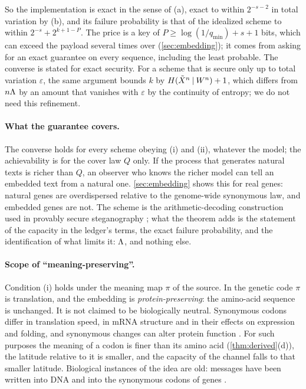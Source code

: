 So the implementation is exact in the sense of (a), exact to within $2^{-s-2}$ in total variation by (b), and its failure probability is that of the idealized scheme to within $2^{-s}+2^{k+1-P}$. The price is a key of $P\ge\log(1/q_{\min})+s+1$ bits, which can exceed the payload several times over (\cref{sec:embedding}); it comes from asking for an exact guarantee on every sequence, including the least probable. The converse is stated for exact security. For a scheme that is secure only up to total variation $\varepsilon$, the same argument bounds $k$ by $H(\tilde X^n\mathbin{\vert} W^n)+1$, which differs from $n\Lambda$ by an amount that vanishes with $\varepsilon$ by the continuity of entropy; we do not need this refinement.

\paragraph{What the guarantee covers.} The converse holds for every scheme obeying (i) and (ii), whatever the model; the achievability is for the cover law $Q$ only. If the process that generates natural texts is richer than $Q$, an observer who knows the richer model can tell an embedded text from a natural one. \cref{sec:embedding} shows this for real genes: natural genes are overdispersed relative to the genome-wide synonymous law, and embedded genes are not. The scheme is the arithmetic-decoding construction used in provably secure steganography \citep{cachin1998,hopper2002,ziegler2019,dewitt2023}; what the theorem adds is the statement of the capacity in the ledger's terms, the exact failure probability, and the identification of what limits it: $\Lambda$, and nothing else.

\paragraph{Scope of ``meaning-preserving''.} Condition (i) holds under the meaning map $\pi$ of the source. In the genetic code $\pi$ is translation, and the embedding is \emph{protein-preserving}: the amino-acid sequence is unchanged. It is not claimed to be biologically neutral. Synonymous codons differ in translation speed, in mRNA structure and in their effects on expression and folding, and synonymous changes can alter protein function \citep{plotkin2011,kimchi2007}. For such purposes the meaning of a codon is finer than its amino acid (\cref{thm:derived}(d)), the latitude relative to it is smaller, and the capacity of the channel falls to that smaller latitude. Biological instances of the idea are old: messages have been written into DNA \citep{clelland1999} and into the synonymous codons of genes \citep{arita2004}.

